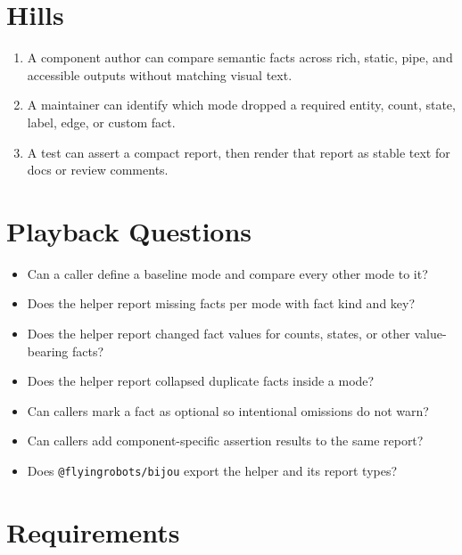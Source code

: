 \section{Hills}\label{record-126-hills}

\begin{enumerate}
\def\labelenumi{\arabic{enumi}.}
\tightlist
\item
  A component author can compare semantic facts across rich, static, pipe, and accessible outputs without matching visual text.
\item
  A maintainer can identify which mode dropped a required entity, count, state, label, edge, or custom fact.
\item
  A test can assert a compact report, then render that report as stable text for docs or review comments.
\end{enumerate}

\section{Playback Questions}\label{record-126-playback-questions}

\begin{itemize}
\tightlist
\item
  Can a caller define a baseline mode and compare every other mode to it?
\item
  Does the helper report missing facts per mode with fact kind and key?
\item
  Does the helper report changed fact values for counts, states, or other value-bearing facts?
\item
  Does the helper report collapsed duplicate facts inside a mode?
\item
  Can callers mark a fact as optional so intentional omissions do not warn?
\item
  Can callers add component-specific assertion results to the same report?
\item
  Does \texttt{@\allowbreak{}f\allowbreak{}l\allowbreak{}y\allowbreak{}i\allowbreak{}n\allowbreak{}g\allowbreak{}r\allowbreak{}o\allowbreak{}b\allowbreak{}o\allowbreak{}t\allowbreak{}s\allowbreak{}/\allowbreak{}b\allowbreak{}i\allowbreak{}j\allowbreak{}o\allowbreak{}u} export the helper and its report types?
\end{itemize}

\section{Requirements}\label{record-126-requirements}

